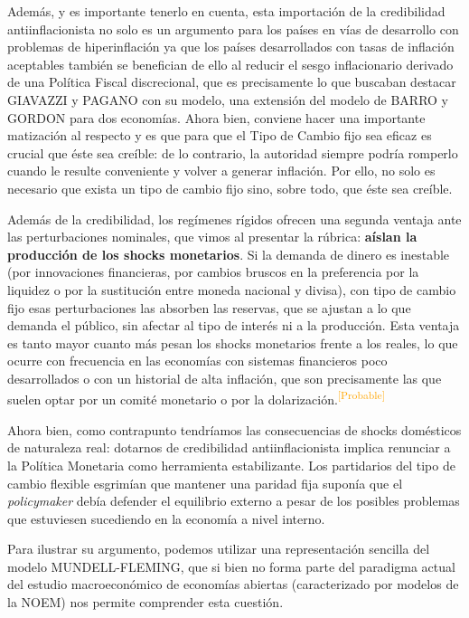 \documentclass[10pt,a4paper]{article}
\begin{document}
Además, y es importante tenerlo en cuenta, esta importación de la credibilidad antiinflacionista no solo es un argumento para los países en vías de desarrollo con problemas de hiperinflación ya que los países desarrollados con tasas de inflación aceptables también se benefician de ello al reducir el sesgo inflacionario derivado de una Política Fiscal discrecional, que es precisamente lo que buscaban destacar GIAVAZZI y PAGANO con su modelo, una extensión del modelo de BARRO y GORDON para dos economías. Ahora bien, conviene hacer una importante matización al respecto y es que para que el Tipo de Cambio fijo sea eficaz es crucial que éste sea creíble: de lo contrario, la autoridad siempre podría romperlo cuando le resulte conveniente y volver a generar inflación. Por ello, no solo es necesario que exista un tipo de cambio fijo sino, sobre todo, que éste sea creíble.

Además de la credibilidad, los regímenes rígidos ofrecen una segunda ventaja ante las perturbaciones nominales, que vimos al presentar la rúbrica: \textbf{aíslan la producción de los shocks monetarios}. Si la demanda de dinero es inestable (por innovaciones financieras, por cambios bruscos en la preferencia por la liquidez o por la sustitución entre moneda nacional y divisa), con tipo de cambio fijo esas perturbaciones las absorben las reservas, que se ajustan a lo que demanda el público, sin afectar al tipo de interés ni a la producción. Esta ventaja es tanto mayor cuanto más pesan los shocks monetarios frente a los reales, lo que ocurre con frecuencia en las economías con sistemas financieros poco desarrollados o con un historial de alta inflación, que son precisamente las que suelen optar por un comité monetario o por la dolarización.\textcolor{orange}{\textsuperscript{[Probable]}}

Ahora bien, como contrapunto tendríamos las consecuencias de shocks domésticos de naturaleza real: dotarnos de credibilidad antiinflacionista implica renunciar a la Política Monetaria como herramienta estabilizante. Los partidarios del tipo de cambio flexible esgrimían que mantener una paridad fija suponía que el \textit{policymaker} debía defender el equilibrio externo a pesar de los posibles problemas que estuviesen sucediendo en la economía a nivel interno. 

Para ilustrar su argumento, podemos utilizar una representación sencilla del modelo MUNDELL-FLEMING, que si bien no forma parte del paradigma actual del estudio macroeconómico de economías abiertas (caracterizado por modelos de la NOEM) nos permite comprender esta cuestión.
\end{document}
